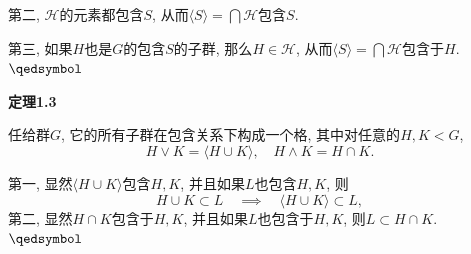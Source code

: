 \documentclass[UTF8]{ctexart}
\begin{document}
第二, $\mathcal{H}$的元素都包含$S$,
从而$\displaystyle\langle S\rangle=\bigcap\mathcal{H}$包含$S$.

第三, 如果$H$也是$G$的包含$S$的子群, 那么$H\in\mathcal{H}$,
从而$\displaystyle\langle S\rangle=\bigcap\mathcal{H}$包含于$H$.
\hfill $\qedsymbol$

\vspace{10pt}

\hypertarget{sec:定理1.3}{}
\noindent\textbf{定理1.3}

任给群$G$, 它的所有子群在包含关系下构成一个格, 其中对任意的$H,K<G$,
\[
    H\lor K=\langle H\cup K\rangle,\quad H\land K=H\cap K.
\]


第一, 显然$\langle H\cup K\rangle$包含$H,K$, 并且如果$L$也包含$H,K$, 则
\[
    H\cup K\subset L\quad\implies\quad\langle H\cup K\rangle\subset L,
\]
第二, 显然$H\cap K$包含于$H,K$, 并且如果$L$也包含于$H,K$, 则$L\subset H\cap K$.
\hfill $\qedsymbol$
\end{document}
